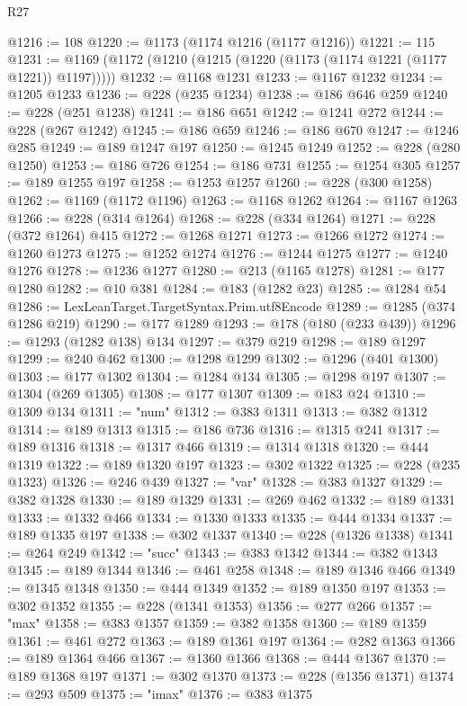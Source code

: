 \begin{lexlean}{R27}
\begin{coremodule}
@1216 := 108
@1220 := @1173 (@1174 @1216 (@1177 @1216))
@1221 := 115
@1231 := @1169 (@1172 (@1210 (@1215 (@1220 (@1173 (@1174 @1221 (@1177 @1221)) @1197)))))
@1232 := @1168 @1231
@1233 := @1167 @1232
@1234 := @1205 @1233
@1236 := @228 (@235 @1234)
@1238 := @186 @646 @259
@1240 := @228 (@251 @1238)
@1241 := @186 @651
@1242 := @1241 @272
@1244 := @228 (@267 @1242)
@1245 := @186 @659
@1246 := @186 @670
@1247 := @1246 @285
@1249 := @189 @1247 @197
@1250 := @1245 @1249
@1252 := @228 (@280 @1250)
@1253 := @186 @726
@1254 := @186 @731
@1255 := @1254 @305
@1257 := @189 @1255 @197
@1258 := @1253 @1257
@1260 := @228 (@300 @1258)
@1262 := @1169 (@1172 @1196)
@1263 := @1168 @1262
@1264 := @1167 @1263
@1266 := @228 (@314 @1264)
@1268 := @228 (@334 @1264)
@1271 := @228 (@372 @1264) @415
@1272 := @1268 @1271
@1273 := @1266 @1272
@1274 := @1260 @1273
@1275 := @1252 @1274
@1276 := @1244 @1275
@1277 := @1240 @1276
@1278 := @1236 @1277
@1280 := @213 (@1165 @1278)
@1281 := @177 @1280
@1282 := @10 @381
@1284 := @183 (@1282 @23)
@1285 := @1284 @54
@1286 := LexLeanTarget.TargetSyntax.Prim.utf8Encode
@1289 := @1285 (@374 @1286 @219)
@1290 := @177 @1289
@1293 := @178 (@180 (@233 @439))
@1296 := @1293 (@1282 @138) @134
@1297 := @379 @219
@1298 := @189 @1297
@1299 := @240 @462
@1300 := @1298 @1299
@1302 := @1296 (@401 @1300)
@1303 := @177 @1302
@1304 := @1284 @134
@1305 := @1298 @197
@1307 := @1304 (@269 @1305)
@1308 := @177 @1307
@1309 := @183 @24
@1310 := @1309 @134
@1311 := "num"
@1312 := @383 @1311
@1313 := @382 @1312
@1314 := @189 @1313
@1315 := @186 @736
@1316 := @1315 @241
@1317 := @189 @1316
@1318 := @1317 @466
@1319 := @1314 @1318
@1320 := @444 @1319
@1322 := @189 @1320 @197
@1323 := @302 @1322
@1325 := @228 (@235 @1323)
@1326 := @246 @439
@1327 := "var"
@1328 := @383 @1327
@1329 := @382 @1328
@1330 := @189 @1329
@1331 := @269 @462
@1332 := @189 @1331
@1333 := @1332 @466
@1334 := @1330 @1333
@1335 := @444 @1334
@1337 := @189 @1335 @197
@1338 := @302 @1337
@1340 := @228 (@1326 @1338)
@1341 := @264 @249
@1342 := "succ"
@1343 := @383 @1342
@1344 := @382 @1343
@1345 := @189 @1344
@1346 := @461 @258
@1348 := @189 @1346 @466
@1349 := @1345 @1348
@1350 := @444 @1349
@1352 := @189 @1350 @197
@1353 := @302 @1352
@1355 := @228 (@1341 @1353)
@1356 := @277 @266
@1357 := "max"
@1358 := @383 @1357
@1359 := @382 @1358
@1360 := @189 @1359
@1361 := @461 @272
@1363 := @189 @1361 @197
@1364 := @282 @1363
@1366 := @189 @1364 @466
@1367 := @1360 @1366
@1368 := @444 @1367
@1370 := @189 @1368 @197
@1371 := @302 @1370
@1373 := @228 (@1356 @1371)
@1374 := @293 @509
@1375 := "imax"
@1376 := @383 @1375

\end{coremodule}
\end{lexlean}
